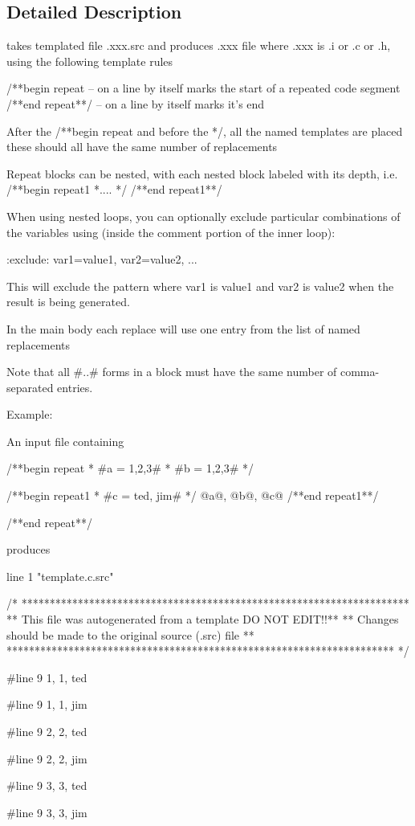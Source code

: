 \subsection{Detailed Description}
\begin{DoxyVerb}takes templated file .xxx.src and produces .xxx file  where .xxx is
.i or .c or .h, using the following template rules

/**begin repeat  -- on a line by itself marks the start of a repeated code
            segment
/**end repeat**/ -- on a line by itself marks it's end

After the /**begin repeat and before the */, all the named templates are placed
these should all have the same number of replacements

Repeat blocks can be nested, with each nested block labeled with its depth,
i.e.
/**begin repeat1
 *....
 */
/**end repeat1**/

When using nested loops, you can optionally exclude particular
combinations of the variables using (inside the comment portion of the inner loop):

 :exclude: var1=value1, var2=value2, ...

This will exclude the pattern where var1 is value1 and var2 is value2 when
the result is being generated.


In the main body each replace will use one entry from the list of named replacements

 Note that all #..# forms in a block must have the same number of
   comma-separated entries.

Example:

    An input file containing

/**begin repeat
 * #a = 1,2,3#
 * #b = 1,2,3#
 */

/**begin repeat1
 * #c = ted, jim#
 */
@a@, @b@, @c@
/**end repeat1**/

/**end repeat**/

    produces

line 1 "template.c.src"

/*
 *********************************************************************
 **       This file was autogenerated from a template  DO NOT EDIT!!**
 **       Changes should be made to the original source (.src) file **
 *********************************************************************
 */

#line 9
1, 1, ted

#line 9
1, 1, jim

#line 9
2, 2, ted

#line 9
2, 2, jim

#line 9
3, 3, ted

#line 9
3, 3, jim\end{DoxyVerb}
 

